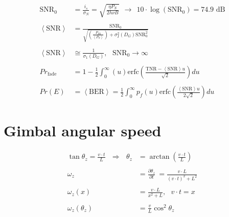 \documentclass[a4paper]{article}
\begin{document}
\begin{align*}
\textrm{SNR}_0 &= \frac{i_s}{\sigma_N} = \sqrt{\frac{\eta P_S}{2h\nu B}} \ \ \rightarrow \ \ 10\cdot \log(\textrm{SNR}_0) = 74.9 \textrm{ dB}
\\
\\
\left\langle\textrm{SNR}\right\rangle &= \frac{\textrm{SNR}_0}{\sqrt{\left(\frac{P_{S0}}{\left\langle P_S\right\rangle}\right)+\sigma_I^2(D_G)\textrm{SNR}_0^2}}
\\
\\
\left\langle\textrm{SNR}\right\rangle &\cong \frac{1}{\sigma_1(D_G)}, \ \ \ \textrm{SNR}_0 \rightarrow \infty
\\
\\
Pr_{\textrm{fade}} &= 1 -\frac{1}{2}\int_0^\infty (u)\textrm{erfc}\left(\frac{\textrm{TNR}-\left\langle \textrm{SNR}\right\rangle u}{\sqrt{2}}\right)du
\\
\\
Pr(E) &= \left\langle \textrm{BER} \right\rangle = \frac{1}{2}\int_0^\infty p_f(u)\textrm{erfc}\left(\frac{\left\langle \textrm{SNR}\right\rangle u}{2\sqrt{2}}\right)du
\end{align*}

\section{Gimbal angular speed}

\begin{align*}
\tan \theta_z = \frac{v\cdot t}{L}\ \ \  \Rightarrow \ \ \  \theta_z &= \arctan \left(\frac{v\cdot t}{L} \right)\\
\\
\omega_z &= \frac{\partial \theta_z}{\partial t} \ = \frac{v\cdot L}{(v\cdot t)^2 + L^2} \\
\\
\omega_z(x) &= \frac{v\cdot L}{x^2 + L} , \ \ \ v\cdot t  = x \\
\\
\omega_z(\theta_z) &= \frac{v}{L}\cos^2\theta_z\\
\end{align*}
\end{document}
